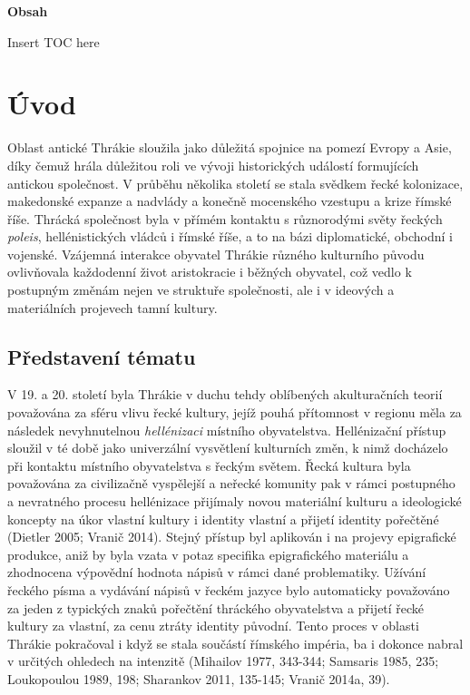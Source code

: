 {\bf Obsah}

Insert TOC here

\chapter{Úvod}

Oblast antické Thrákie sloužila jako důležitá spojnice na pomezí Evropy a Asie, díky čemuž hrála důležitou roli ve vývoji historických událostí formujících antickou společnost. V průběhu několika století se stala svědkem řecké kolonizace, makedonské expanze a nadvlády a konečně mocenského vzestupu a krize římské říše. Thrácká společnost byla v přímém kontaktu s různorodými světy řeckých {\em poleis}, hellénistických vládců i římské říše, a to na bázi diplomatické, obchodní i vojenské. Vzájemná interakce obyvatel Thrákie různého kulturního původu ovlivňovala každodenní život aristokracie i běžných obyvatel, což vedlo k postupným změnám nejen ve struktuře společnosti, ale i v ideových a materiálních projevech tamní kultury.

\section[představení-tématu]{Představení tématu}

V 19. a 20. století byla Thrákie v duchu tehdy oblíbených akulturačních teorií považována za sféru vlivu řecké kultury, jejíž pouhá přítomnost v regionu měla za následek nevyhnutelnou {\em hellénizaci} místního obyvatelstva. Hellénizační přístup sloužil v té době jako univerzální vysvětlení kulturních změn, k nimž docházelo při kontaktu místního obyvatelstva s řeckým světem. Řecká kultura byla považována za civilizačně vyspělejší a neřecké komunity pak v rámci postupného a nevratného procesu hellénizace přijímaly novou materiální kulturu a ideologické koncepty na úkor vlastní kultury i identity vlastní a přijetí identity pořečtěné (Dietler 2005; Vranič 2014). Stejný přístup byl aplikován i na projevy epigrafické produkce, aniž by byla vzata v potaz specifika epigrafického materiálu a zhodnocena výpovědní hodnota nápisů v rámci dané problematiky. Užívání řeckého písma a vydávání nápisů v řeckém jazyce bylo automaticky považováno za jeden z typických znaků pořečtění thráckého obyvatelstva a přijetí řecké kultury za vlastní, za cenu ztráty identity původní. Tento proces v oblasti Thrákie pokračoval i když se stala součástí římského impéria, ba i dokonce nabral v určitých ohledech na intenzitě (Mihailov 1977, 343-344; Samsaris 1985, 235; Loukopoulou 1989, 198; Sharankov 2011, 135-145; Vranič 2014a, 39).

